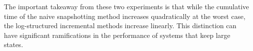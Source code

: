 The important takeaway from these two experiments is that while the cumulative time of the naive snapshotting method increases quadratically at the worst case, the log-structured incremental methods increase linearly. This distinction can have significant ramifications in the performance of systems that keep large states.







